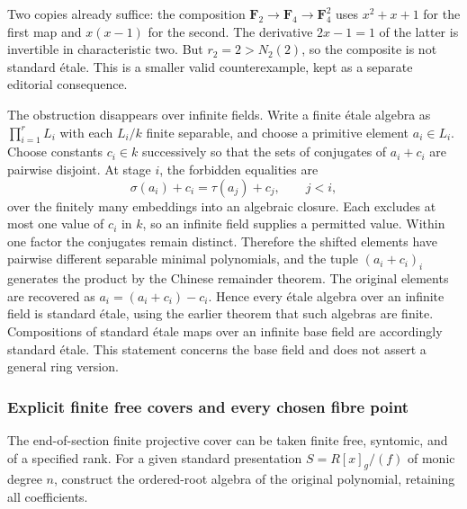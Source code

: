 Two copies already suffice: the composition \(\mathbf F_2\to\mathbf F_4\to\mathbf F_4^2\) uses \(x^2+x+1\) for the first map and \(x(x-1)\) for the second. The derivative \(2x-1=1\) of the latter is invertible in characteristic two. But \(r_2=2>N_2(2)\), so the composite is not standard étale. This is a smaller valid counterexample, kept as a separate editorial consequence.

The obstruction disappears over infinite fields. Write a finite étale algebra as \(\prod_{i=1}^r L_i\) with each \(L_i/k\) finite separable, and choose a primitive element \(a_i\in L_i\). Choose constants \(c_i\in k\) successively so that the sets of conjugates of \(a_i+c_i\) are pairwise disjoint. At stage \(i\), the forbidden equalities are \[
\sigma(a_i)+c_i=\tau(a_j)+c_j,\qquad j<i,
\] over the finitely many embeddings into an algebraic closure. Each excludes at most one value of \(c_i\) in \(k\), so an infinite field supplies a permitted value. Within one factor the conjugates remain distinct. Therefore the shifted elements have pairwise different separable minimal polynomials, and the tuple \((a_i+c_i)_i\) generates the product by the Chinese remainder theorem. The original elements are recovered as \(a_i=(a_i+c_i)-c_i\). Hence every étale algebra over an infinite field is standard étale, using the earlier theorem that such algebras are finite. Compositions of standard étale maps over an infinite base field are accordingly standard étale. This statement concerns the base field and does not assert a general ring version.

\subsubsection{Explicit finite free covers and every chosen fibre point}\label{algebra-proof-052-explicit-finite-free-covers-and-every-chosen-fibre-point}

The end-of-section finite projective cover can be taken finite free, syntomic, and of a specified rank. For a given standard presentation \(S=R[x]_g/(f)\) of monic degree \(n\), construct the ordered-root algebra of the original polynomial, retaining all coefficients.

